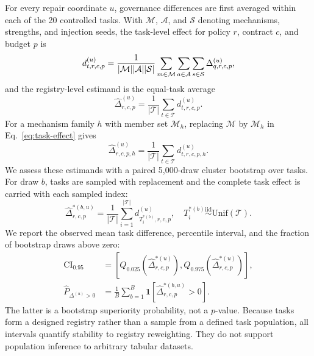 \documentclass[sigconf,review]{acmart}
\begin{document}
For every repair coordinate $u$, governance differences are first averaged
within each of the 20 controlled tasks. With $\mathcal{M}$, $\mathcal{A}$, and
$\mathcal{S}$ denoting mechanisms, strengths, and injection seeds, the
task-level effect for policy $r$, contract $c$, and budget $p$ is
\begin{equation}
 d^{(u)}_{t,r,c,p}={1\over|\mathcal{M}||\mathcal{A}||\mathcal{S}|}
 \sum_{m\in\mathcal{M}}\sum_{a\in\mathcal{A}}\sum_{s\in\mathcal{S}}
 \Delta^{(u)}_{q,r,c,p},
 \label{eq:task-effect}
\end{equation}
and the registry-level estimand is the equal-task average
\begin{equation}
 \widehat{\Delta}^{(u)}_{r,c,p}=\frac{1}{|\mathcal{T}|}
 \sum_{t\in\mathcal{T}}d^{(u)}_{t,r,c,p}.
 \label{eq:registry-effect}
\end{equation}
For a mechanism family $h$ with member set $\mathcal{M}_h$, replacing
$\mathcal{M}$ by $\mathcal{M}_h$ in Eq.~\ref{eq:task-effect} gives
\begin{equation}
 \widehat{\Delta}^{(u)}_{r,c,p,h}=\frac{1}{|\mathcal{T}|}
 \sum_{t\in\mathcal{T}}d^{(u)}_{t,r,c,p,h}.
 \label{eq:family-effect}
\end{equation}
We assess these estimands with a paired 5,000-draw cluster bootstrap over
tasks. For draw $b$, tasks are sampled with replacement and the complete task
effect is carried with each sampled index:
\begin{equation}
 \widehat{\Delta}^{*(b,u)}_{r,c,p}
 =\frac{1}{|\mathcal{T}|}\sum_{i=1}^{|\mathcal{T}|}
 d^{(u)}_{T_i^{*(b)},r,c,p},
 \quad T_i^{*(b)}\stackrel{\mathrm{iid}}{\sim}\mathrm{Unif}(\mathcal{T}).
 \label{eq:cluster-bootstrap}
\end{equation}
We report the observed mean task difference, percentile interval, and the
fraction of bootstrap draws above zero:
\begin{equation}
\begin{split}
 \mathrm{CI}_{0.95}
 &=\left[Q_{0.025}(\widehat{\Delta}^{*(u)}_{r,c,p}),
          Q_{0.975}(\widehat{\Delta}^{*(u)}_{r,c,p})\right],\\
 \widehat{P}_{\Delta^{(u)}>0}
 &=\frac{1}{B}\sum_{b=1}^{B}\mathbf{1}
   [\widehat{\Delta}^{*(b,u)}_{r,c,p}>0].
\end{split}
 \label{eq:bootstrap-summary}
\end{equation}
The latter is a bootstrap superiority probability, not a $p$-value. Because
tasks form a designed registry rather than
a sample from a defined task population, all intervals quantify stability to
registry reweighting. They do not support population inference to arbitrary
tabular datasets.
\end{document}
